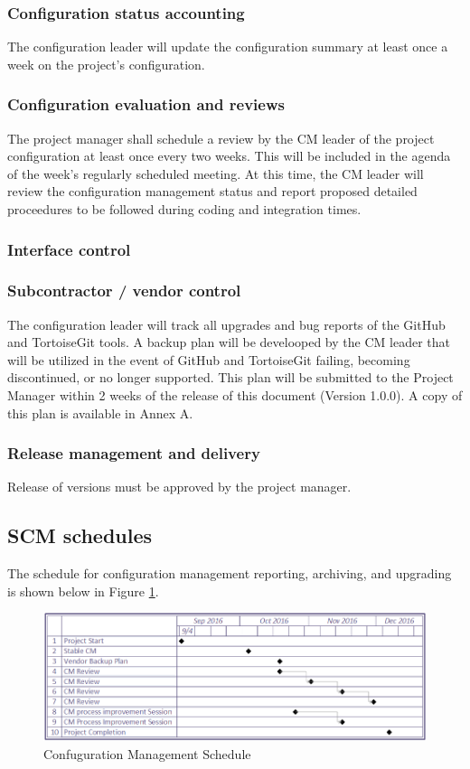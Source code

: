 \documentclass{scrartcl}
\begin{document}
\subsubsection{Configuration status accounting}
The configuration leader will update the configuration summary at least once a week on the project's configuration.
\subsubsection{Configuration evaluation and reviews}
The project manager shall schedule a review by the CM leader of the project configuration at least once every two weeks.  This will be included in the agenda of the week's regularly scheduled meeting.  At this time, the CM leader will review the configuration management status and report proposed detailed proceedures to be followed during coding and integration times.
\subsubsection{Interface control}

\subsubsection{Subcontractor / vendor control}
The configuration leader will track all upgrades and bug reports of the GitHub and TortoiseGit tools.  A backup plan will be develooped by the CM leader that will be utilized in the event of GitHub and TortoiseGit failing, becoming discontinued, or no longer supported.  This plan will be submitted to the Project Manager within 2 weeks of the release of this document (Version 1.0.0).  A copy of this plan is available in Annex A.
\subsubsection{Release management and delivery}
Release of versions must be approved by the project manager.

\subsection{SCM schedules}
The schedule for configuration management reporting, archiving, and upgrading is shown below in Figure \ref{fig:schedule}.
\begin{figure}[H]
\centering
\includegraphics[scale=0.65]{CMSchedule}
 \caption{Confuguration Management Schedule}
 \label{fig:schedule}
\end{figure}
\end{document}
